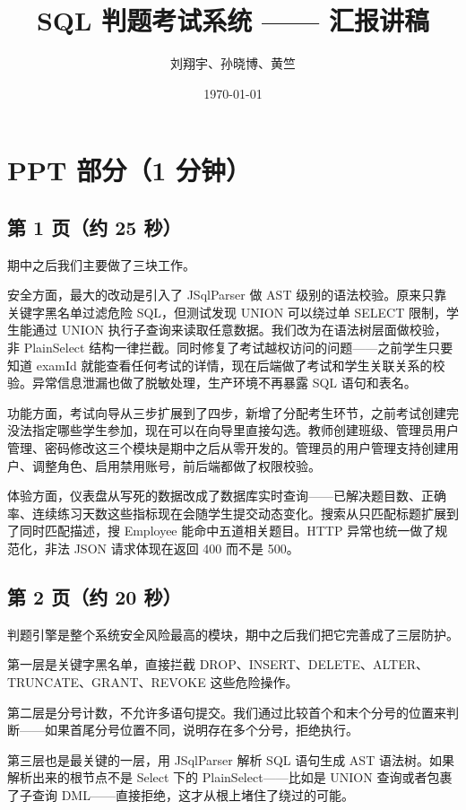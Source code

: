 \documentclass[12pt,a4paper]{article}
\title{\textbf{SQL 判题考试系统 —— 汇报讲稿}}
\author{刘翔宇、孙晓博、黄竺}
\date{\today}
\begin{document}
\maketitle

\section*{PPT 部分（1 分钟）}

\subsection*{第 1 页（约 25 秒）}

期中之后我们主要做了三块工作。

安全方面，最大的改动是引入了 JSqlParser 做 AST 级别的语法校验。原来只靠关键字黑名单过滤危险 SQL，但测试发现 UNION 可以绕过单 SELECT 限制，学生能通过 UNION 执行子查询来读取任意数据。我们改为在语法树层面做校验，非 PlainSelect 结构一律拦截。同时修复了考试越权访问的问题——之前学生只要知道 examId 就能查看任何考试的详情，现在后端做了考试和学生关联关系的校验。异常信息泄漏也做了脱敏处理，生产环境不再暴露 SQL 语句和表名。

功能方面，考试向导从三步扩展到了四步，新增了分配考生环节，之前考试创建完没法指定哪些学生参加，现在可以在向导里直接勾选。教师创建班级、管理员用户管理、密码修改这三个模块是期中之后从零开发的。管理员的用户管理支持创建用户、调整角色、启用禁用账号，前后端都做了权限校验。

体验方面，仪表盘从写死的数据改成了数据库实时查询——已解决题目数、正确率、连续练习天数这些指标现在会随学生提交动态变化。搜索从只匹配标题扩展到了同时匹配描述，搜 Employee 能命中五道相关题目。HTTP 异常也统一做了规范化，非法 JSON 请求体现在返回 400 而不是 500。

\subsection*{第 2 页（约 20 秒）}

判题引擎是整个系统安全风险最高的模块，期中之后我们把它完善成了三层防护。

第一层是关键字黑名单，直接拦截 DROP、INSERT、DELETE、ALTER、TRUNCATE、GRANT、REVOKE 这些危险操作。

第二层是分号计数，不允许多语句提交。我们通过比较首个和末个分号的位置来判断——如果首尾分号位置不同，说明存在多个分号，拒绝执行。

第三层也是最关键的一层，用 JSqlParser 解析 SQL 语句生成 AST 语法树。如果解析出来的根节点不是 Select 下的 PlainSelect——比如是 UNION 查询或者包裹了子查询 DML——直接拒绝，这才从根上堵住了绕过的可能。
\end{document}
